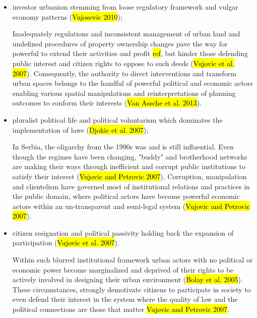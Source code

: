 \documentclass[11pt]{report}
\begin{document}
\begin{itemize}
\item investor urbanism stemming from loose regulatory framework and vulgar economy patterns (\hl{Vujosevic 2010});

Inadequately regulations and inconsistent management of urban land and undefined procedures of property ownership  changes pave the way for powerful to extend their activities and profit \hl{ref}, but hinder those defending public interest and citizen rights to oppose to such deeds (\hl{Vujovic et al. 2007}).
Consequently, the authority to direct interventions and transform urban spaces belongs to the handful of powerful political and economic actors enabling various spatial manipulations and reinterpretations of planning outcomes to conform their interests (\hl{Van Assche et al. 2013}).

\item pluralist political life and political voluntarism which dominates the implementation of laws (\hl{Djokic et al. 2007});

In Serbia, the oligarchy from the 1990s was and is still influential. Even though the regimes have been changing, "buddy" and brotherhood networks are making their ways through inefficient and corrupt public institutions to satisfy their interest (\hl{Vujovic and Petrovic 2007}).
Corruption, manipulation and clientelism have governed most of institutional relations and practices in the 
public domain, where political actors have become powerful economic actors within an un-transparent and 
semi-legal system (\hl{Vujovic and Petrovic 2007}).

\item citizen resignation and political passivity holding back the expansion of participation (\hl{Vujovic et al. 2007}). 

Within such blurred institutional framework urban actors with no political or economic power become marginalized and deprived of their rights to be actively involved in designing their urban environment (\hl{Bolay et al. 2005}).
These circumstances, strongly demotivate citizens to participate in society to even defend their interest in the system where the quality of law and the political connections are those that matter \hl{Vujovic and Petrovic 2007}.
\end{itemize}
\end{document}

